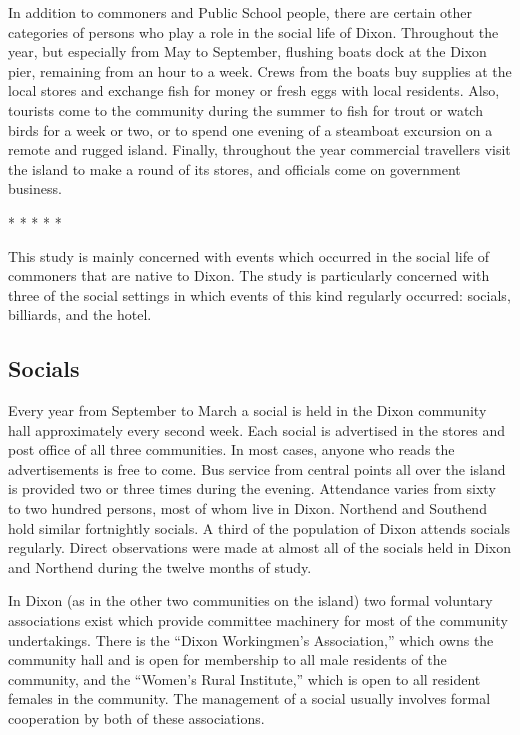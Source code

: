 \documentclass[openany,nobib]{tufte-book}
\begin{document}
In addition to commoners and Public School people, there are certain
other categories of persons who play a role in the social life of Dixon.
Throughout the year, but especially from May to September, flushing
boats dock at the Dixon pier, remaining from an hour to a week. Crews
from the boats buy supplies at the local stores and exchange fish for
money or fresh eggs with local residents. Also, tourists come to the
community during the summer to fish for trout or watch birds for a week
or two, or to spend one evening of a steamboat excursion on a remote and
rugged island. Finally, throughout the year commercial travellers visit
the island to make a round of its stores, and officials come on
government business.

\vspace{.2in}
\begin{centering}

\Large{* * * * *}

\end{centering}
\vspace{.17in}

\noindent This study is mainly concerned with events which occurred in the social
life of commoners that are native to Dixon. The study is particularly
concerned with three of the social settings in which events of this kind
regularly occurred: socials, billiards, and the hotel.

\hypertarget{socials}{%
\subsection{Socials}\label{socials}}

Every year from September to March a social is held in the Dixon
community hall approximately every second week. Each social is
advertised in the stores and post office of all three communities. In
most cases, anyone who reads the advertisements is free to come. Bus
service from central points all over the island is provided two or three
times during the evening. Attendance varies from sixty to two hundred
persons, most of whom live in Dixon. Northend and Southend hold similar
fortnightly socials. A third of the population of Dixon attends socials
regularly. Direct observations were made at almost all of the socials
held in Dixon and Northend during the twelve months of study.

In Dixon (as in the other two communities on the island) two formal
voluntary associations exist which provide committee machinery for most
of the community undertakings. There is the ``Dixon Workingmen's
Association,'' which owns the community hall and is open for membership
to all male residents of the community, and the ``Women's Rural
Institute,'' which is open to all resident females in the community. The
management of a social usually involves formal cooperation by both of
these associations.
\end{document}
